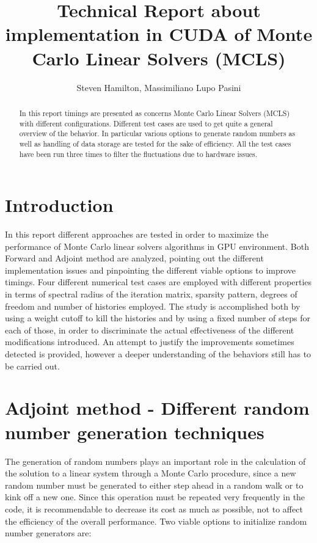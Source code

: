 \documentclass[a4paper,10pt]{article}
\title{Technical Report about implementation in CUDA of Monte Carlo 
Linear Solvers (MCLS)}
\author{Steven Hamilton, Massimiliano Lupo Pasini}
\date{}
\begin{document}
\maketitle

\begin{abstract}
In this report timings are presented as concerns Monte 
Carlo Linear Solvers (MCLS) with different configurations. Different test 
cases are used to get quite a general overview of the behavior. 
In particular 
various options to generate random numbers as well as handling of data storage 
are 
tested for the sake of efficiency. All the test cases have been run three times 
to filter the fluctuations due to hardware issues. 
\end{abstract}

\section*{Introduction}
In this report different approaches are tested in order to maximize the 
performance of Monte Carlo linear solvers algorithms in GPU environment. 
Both Forward and Adjoint method are analyzed, pointing out the different 
implementation issues and pinpointing the different viable options to improve 
timings.
Four different numerical test cases are employed with different properties in 
terms of spectral radius of the iteration matrix, sparsity pattern, degrees 
of freedom and number of histories employed. The study is accomplished both by 
using a weight cutoff to kill the 
histories and by using a fixed number of steps for each of those, in order to 
discriminate the actual effectiveness of the different modifications 
introduced. An attempt to justify the improvements sometimes detected is 
provided, however a deeper understanding of the behaviors still has to be 
carried out. 



\section{Adjoint method - Different random number generation techniques}
The generation of random numbers plays an important role in the calculation of 
the solution to 
a linear system through a Monte Carlo procedure, since a new random number must 
be generated 
to either step ahead in a random walk or to kink off a new one.
Since this operation must be repeated very frequently in the code, it is 
recommendable to 
decrease its cost as much as possible, not to affect the efficiency of the 
overall performance.
Two viable options to initialize random number generators are:
\end{document}
